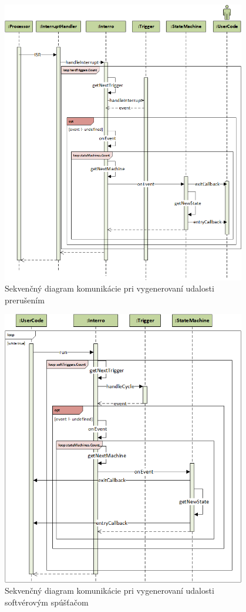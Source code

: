 \begin{figure}[!h]
    \centering
    \includegraphics[width=0.95\textwidth]{img/interrupt-sequence.png}
    \caption{Sekvenčný diagram komunikácie pri vygenerovaní udalosti prerušením}
    \label{figure:interrupt-trigger}
\end{figure}



\begin{figure}[!h]
    \centering
    \includegraphics[width=0.95\textwidth]{img/softTrigger-sequence.png}
    \caption{Sekvenčný diagram komunikácie pri vygenerovaní udalosti softvérovým spúšťačom}
    \label{figure:soft-trigger}
\end{figure}


